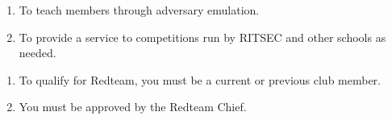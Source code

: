 

\begin{enumerate}
	\item To teach members through adversary emulation.
	\item To provide a service to competitions run by RITSEC and other schools as needed.
\end{enumerate}


\begin{enumerate}
	\item To qualify for Redteam, you must be a current or previous club member.
	\item You must be approved by the Redteam Chief.
\end{enumerate}
